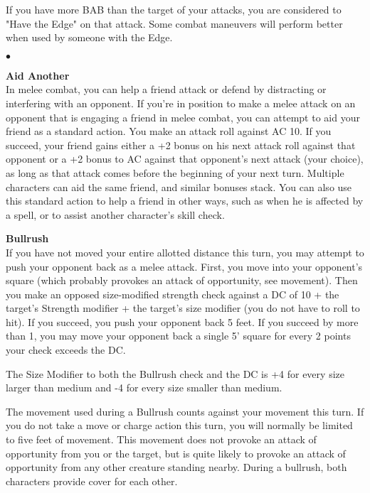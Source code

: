 If you have more BAB than the target of your attacks, you are considered to "Have the Edge" on that attack. Some combat maneuvers will perform better when used by someone with the Edge.

\begin{list}{$\bullet$}{\itemspace}

\hypertarget{combat:aidanother}{}
\normalsize\item\textbf{{Aid Another}}\\ \small
In melee combat, you can help a friend attack or defend by distracting or interfering with an opponent. If you're in position to make a melee attack on an opponent that is engaging a friend in melee combat, you can attempt to aid your friend as a standard action. You make an attack roll against AC 10. If you succeed, your friend gains either a +2 bonus on his next attack roll against that opponent or a +2 bonus to AC against that opponent's next attack (your choice), as long as that attack comes before the beginning of your next turn. Multiple characters can aid the same friend, and similar bonuses stack. You can also use this standard action to help a friend in other ways, such as when he is affected by a spell, or to assist another character's skill check.\\

\hypertarget{combat:bullrush}{}
\normalsize\item\textbf{{Bullrush}}\\ \small
If you have not moved your entire allotted distance this turn, you may attempt to push your opponent back as a melee attack. First, you move into your opponent's square (which probably provokes an attack of opportunity, see movement). Then you make an opposed size-modified strength check against a DC of 10 + the target's Strength modifier + the target's size modifier (you do not have to roll to hit). If you succeed, you push your opponent back 5 feet. If you succeed by more than 1, you may move your opponent back a single 5' square for every 2 points your check exceeds the DC.

 The Size Modifier to both the Bullrush check and the DC is +4 for every size larger than medium and -4 for every size smaller than medium.

 The movement used during a Bullrush counts against your movement this turn. If you do not take a move or charge action this turn, you will normally be limited to five feet of movement. This movement does not provoke an attack of opportunity from you or the target, but is quite likely to provoke an attack of opportunity from any other creature standing nearby. During a bullrush, both characters provide cover for each other.


\end{list}
